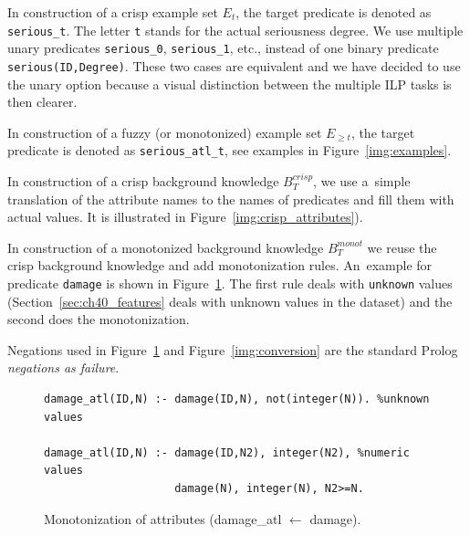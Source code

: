 In construction of a crisp example set $E_t$, the target predicate is denoted as \texttt{serious\_t}. The letter \texttt{t} stands for the actual seriousness degree. We use multiple unary predicates \texttt{serious\_0}, \texttt{serious\_1}, etc., instead of one binary predicate \texttt{serious(ID,Degree)}. These two cases are equivalent and we have decided to use the unary option because a visual distinction between the multiple ILP tasks is then clearer.

In construction of a fuzzy (or monotonized) example set $E_{\ge t}$, the target predicate is denoted as \texttt{serious\_atl\_t}, see examples in Figure~\ref{img:examples}.



In construction of a crisp background knowledge $B^{crisp}_{T}$, we use a~simple translation of the attribute names to the names of predicates and fill them with actual values. It is illustrated in Figure~\ref{img:crisp_attributes}). 



In construction of a monotonized background knowledge $B^{monot}_T$ we reuse the crisp background knowledge and add monotonization rules. An~example for predicate \texttt{damage} is shown in Figure~\ref{img:attribute_monotonization}.
The first rule deals with \texttt{unknown} values (Section~\ref{sec:ch40_features} deals with unknown values in the dataset) and the second does the monotonization. 

Negations used in Figure~\ref{img:attribute_monotonization} and Figure~\ref{img:conversion} are the standard Prolog \emph{negations as failure}.



\begin{figure}	
\begin{verbatim}
damage_atl(ID,N) :- damage(ID,N), not(integer(N)). %unknown values

damage_atl(ID,N) :- damage(ID,N2), integer(N2), %numeric values
                    damage(N), integer(N), N2>=N.
\end{verbatim}						
	\caption{Monotonization of attributes (damage\_atl $\leftarrow$ damage).}
	\label{img:attribute_monotonization}
\end{figure}


